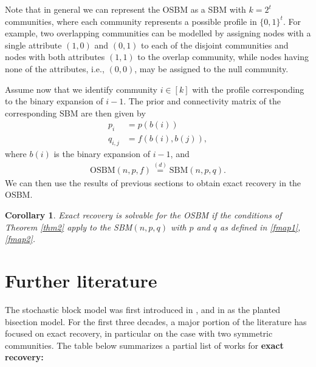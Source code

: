 \documentclass[11pt]{article}
\newcommand{\1}{\mathbb{1}}
\newtheorem{corollary}{Corollary}
\begin{document}
Note that in general we can represent the OSBM as a SBM with $k=2^t$ communities, where each community represents a possible profile in $\{0,1\}^t$. For example, two overlapping communities can be modelled by assigning nodes with a single attribute $(1,0)$ and $(0,1)$ to each of the disjoint communities and nodes with both attributes $(1,1)$ to the overlap community, while nodes having none of the attributes, i.e.,  $(0,0)$, may be assigned to the null community.


Assume now that we identify community $i \in [k]$ with the profile corresponding to the binary expansion of $i-1$. The prior and connectivity matrix of the corresponding SBM are then given by 
\begin{align}
p_i&=p(b(i))\label{fmap1} \\
q_{i,j}&=f(b(i),b(j)), \label{fmap2}
\end{align}
where $b(i)$ is the binary expansion of $i-1$, and 
\begin{align}
\text{OSBM}(n,p,f) \stackrel{(d)}{=} \text{SBM}(n,p,q).
\end{align}
We can then use the results of previous sections to obtain exact recovery in the OSBM. 
\begin{corollary}
Exact recovery is solvable for the OSBM if the conditions of Theorem \ref{thm2} apply to the SBM$(n,p,q)$ with $p$ and $q$ as defined in \eqref{fmap1}, \eqref{fmap2}.  
\end{corollary}





\section{Further literature}\label{related_lit}

The stochastic block model was first introduced in \cite{holland}, and in \cite{bui,dyer} as the planted bisection model. 
For the first three decades, a major portion of the literature has focused on exact recovery, in particular on the case with two symmetric communities. The table below summarizes a partial list of works for {\bf exact recovery:} 
\end{document}
